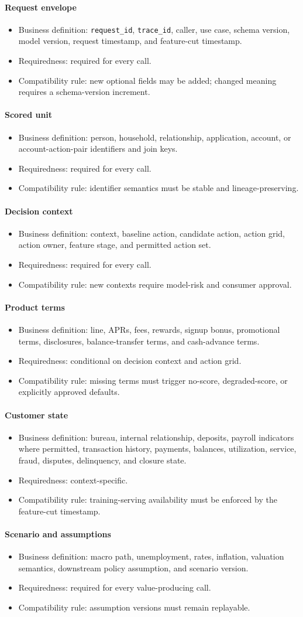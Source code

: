 \documentclass[11pt]{article}
\newcommand{\1}{\mathbf{1}}
\newcommand{\code}[1]{\nolinkurl{#1}}
\newcommand{\contractitem}[2]{\paragraph{#1}\begin{itemize}[leftmargin=1.5em,itemsep=0.12em,topsep=0.18em]#2\end{itemize}}
\begin{document}
\contractitem{Request envelope}{
  \item Business definition: \code{request_id}, \code{trace_id}, caller, use
        case, schema version, model version, request timestamp, and
        feature-cut timestamp.
  \item Requiredness: required for every call.
  \item Compatibility rule: new optional fields may be added; changed meaning
        requires a schema-version increment.
}
\contractitem{Scored unit}{
  \item Business definition: person, household, relationship, application,
        account, or account-action-pair identifiers and join keys.
  \item Requiredness: required for every call.
  \item Compatibility rule: identifier semantics must be stable and
        lineage-preserving.
}
\contractitem{Decision context}{
  \item Business definition: context, baseline action, candidate action,
        action grid, action owner, feature stage, and permitted action set.
  \item Requiredness: required for every call.
  \item Compatibility rule: new contexts require model-risk and consumer
        approval.
}
\contractitem{Product terms}{
  \item Business definition: line, APRs, fees, rewards, signup bonus,
        promotional terms, disclosures, balance-transfer terms, and
        cash-advance terms.
  \item Requiredness: conditional on decision context and action grid.
  \item Compatibility rule: missing terms must trigger no-score,
        degraded-score, or explicitly approved defaults.
}
\contractitem{Customer state}{
  \item Business definition: bureau, internal relationship, deposits, payroll
        indicators where permitted, transaction history, payments, balances,
        utilization, service, fraud, disputes, delinquency, and closure state.
  \item Requiredness: context-specific.
  \item Compatibility rule: training-serving availability must be enforced by
        the feature-cut timestamp.
}
\contractitem{Scenario and assumptions}{
  \item Business definition: macro path, unemployment, rates, inflation,
        valuation semantics, downstream policy assumption, and scenario
        version.
  \item Requiredness: required for every value-producing call.
  \item Compatibility rule: assumption versions must remain replayable.
}
\end{document}
